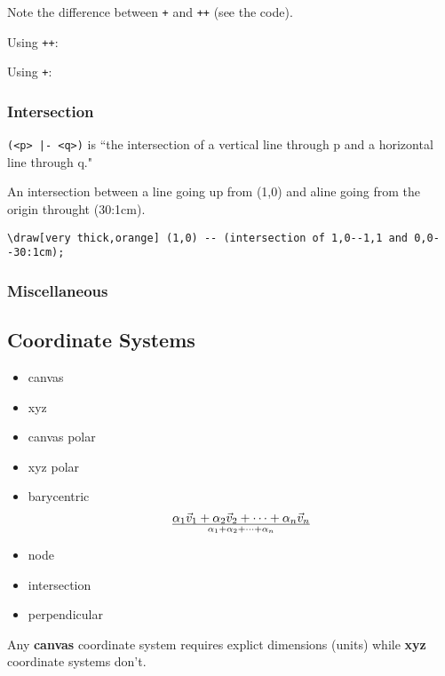 Note the difference between \verb|+| and \verb|++| (see the code).

Using \verb|++|:

Using \verb|+|:

\subsubsection{Intersection}
\verb/(<p> |- <q>)/ is ``the intersection of a vertical line through p and a horizontal line through q."

An intersection between a line going up from (1,0) and aline going from 
the origin throught (30:1cm).

\begin{tcolorbox}
    \verb|\draw[very thick,orange] (1,0) -- (intersection of 1,0--1,1 and 0,0--30:1cm);|
\end{tcolorbox}

\subsubsection{Miscellaneous}
\subsection{Coordinate Systems}
\begin{itemize}
    \item canvas
    \item xyz
    \item canvas polar
    \item xyz polar
    \item barycentric
	\[
	    {\alpha_1\vec{v}_1 + \alpha_2\vec{v}_2 + \cdots + \alpha_n\vec{v}_n} \over {\alpha_1 + \alpha_2 + \cdots + \alpha_n}
	    \]
    \item node
    \item intersection
    \item perpendicular
\end{itemize}
Any {\bf canvas} coordinate system requires explict dimensions (units)
while {\bf xyz} coordinate systems don't.

